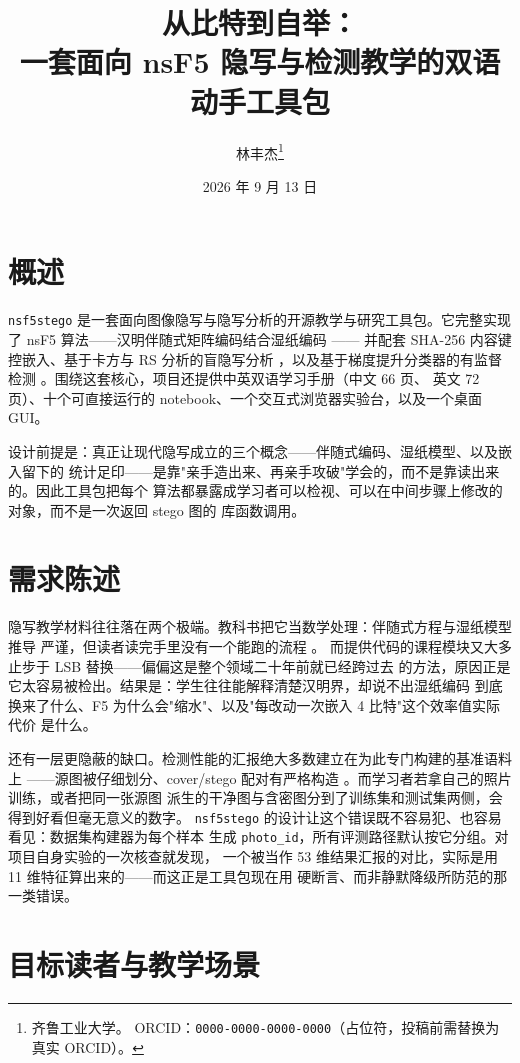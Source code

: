 \documentclass[11pt,a4paper,fontset=windows]{ctexart}
\title{\vspace{-1.4cm}\bfseries 从比特到自举：\\[3pt]
一套面向 nsF5 隐写与检测教学的双语动手工具包}
\author{林丰杰\thanks{齐鲁工业大学。
  ORCID：\texttt{0000-0000-0000-0000}（占位符，投稿前需替换为真实 ORCID）。}}
\date{2026 年 9 月 13 日}
\begin{document}
\maketitle
\vspace{-1.0em}

\section*{概述}

\texttt{nsf5stego} 是一套面向图像隐写与隐写分析的开源教学与研究工具包。它完整实现了
nsF5 算法——汉明伴随式矩阵编码结合湿纸编码 \citep{westfeld2001f5,fridrich2005wet}——
并配套 SHA-256 内容键控嵌入、基于卡方与 RS 分析的盲隐写分析
\citep{westfeld1999,fridrich2001rs}，以及基于梯度提升分类器的有监督检测
\citep{ke2017lightgbm}。围绕这套核心，项目还提供中英双语学习手册（中文 66 页、
英文 72 页）、十个可直接运行的 notebook、一个交互式浏览器实验台，以及一个桌面 GUI。

设计前提是：真正让现代隐写成立的三个概念——伴随式编码、湿纸模型、以及嵌入留下的
统计足印——是靠"亲手造出来、再亲手攻破"学会的，而不是靠读出来的。因此工具包把每个
算法都暴露成学习者可以检视、可以在中间步骤上修改的对象，而不是一次返回 stego 图的
库函数调用。

\section*{需求陈述}

隐写教学材料往往落在两个极端。教科书把它当数学处理：伴随式方程与湿纸模型推导
严谨，但读者读完手里没有一个能跑的流程 \citep{fridrich2009book,provos2003hide}。
而提供代码的课程模块又大多止步于 LSB 替换——偏偏这是整个领域二十年前就已经跨过去
的方法，原因正是它太容易被检出。结果是：学生往往能解释清楚汉明界，却说不出湿纸编码
到底换来了什么、F5 为什么会"缩水"、以及"每改动一次嵌入 4 比特"这个效率值实际代价
是什么。

还有一层更隐蔽的缺口。检测性能的汇报绝大多数建立在为此专门构建的基准语料上
\citep{bas2011boss}——源图被仔细划分、cover/stego 配对有严格构造
\citep{pevny2010spam,fridrich2012rich}。而学习者若拿自己的照片训练，或者把同一张源图
派生的干净图与含密图分到了训练集和测试集两侧，会得到好看但毫无意义的数字。
\texttt{nsf5stego} 的设计让这个错误既不容易犯、也容易看见：数据集构建器为每个样本
生成 \texttt{photo\_id}，所有评测路径默认按它分组。对项目自身实验的一次核查就发现，
一个被当作 53 维结果汇报的对比，实际是用 11 维特征算出来的——而这正是工具包现在用
硬断言、而非静默降级所防范的那一类错误。

\section*{目标读者与教学场景}
\end{document}
